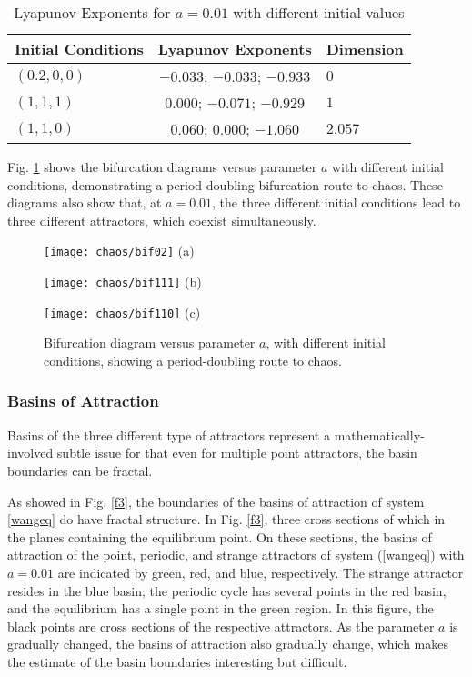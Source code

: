 \begin{table}[htbp!]
  \centering
  \caption{\label{t4.4}Lyapunov Exponents for $a = 0.01$ with different initial values}
 \begin{tabular}{lcl}
  \hline
  Initial Conditions & Lyapunov Exponents & Dimension\\
  \hline
  $(0.2, 0, 0)$ & $-0.033$;  $-0.033$;  $-0.933$ & $0$ \\
     $(1, 1, 1)$ & $0.000$;  $-0.071$;  $-0.929$ & $1$ \\
     $(1, 1, 0)$ & $0.060$; $0.000$; $-1.060$ & $2.057$ \\
  \hline
 \end{tabular}
\end{table}

Fig. \ref{bif} shows the bifurcation diagrams versus parameter $a$ with different initial conditions, demonstrating a period-doubling
bifurcation route to chaos. These diagrams also show that, at $a=0.01$, the three different initial conditions lead to three different
attractors, which coexist simultaneously.

\begin{figure}
\centering
\begin{minipage}[b]{0.6\textwidth}
\centering
\texttt{[image: chaos/bif02]}
{\small (a)}
\end{minipage}
\begin{minipage}[b]{0.6\textwidth}
\centering
\texttt{[image: chaos/bif111]}
{\small (b)}
\end{minipage}
\begin{minipage}[b]{0.6\textwidth}
\centering
\texttt{[image: chaos/bif110]}
{\small (c)}
\end{minipage}
\caption{Bifurcation diagram versus parameter $a$, with different initial conditions, showing a period-doubling route to chaos.} \label{bif}
\end{figure}

\subsubsection{Basins of Attraction}

Basins of the three different type of attractors represent a mathematically-involved subtle issue for that even for multiple
point attractors, the basin boundaries can be fractal.

As showed in Fig. \ref{f3}, the boundaries of the basins of attraction of system \ref{wangeq} do have fractal structure.
In Fig. \ref{f3}, three cross sections of which in the planes containing the equilibrium point. On these sections,
the basins of attraction of the point, periodic, and strange attractors of system (\ref{wangeq}) with $a=0.01$ are indicated by
green, red, and blue, respectively. The strange attractor resides in the blue basin; the periodic cycle has several points in
the red basin, and the equilibrium has a single point in the green region. In this figure, the black points are cross sections
of the respective attractors. As the parameter $a$ is gradually changed, the basins of attraction also gradually change, which
makes the estimate of the basin boundaries interesting but difficult.

